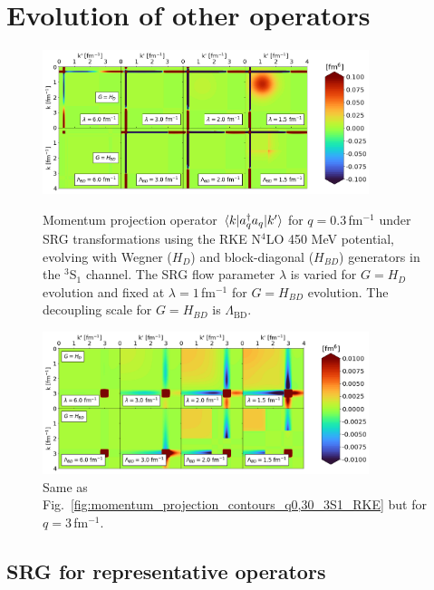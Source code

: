 \documentclass[10pt,aps,prc,floatfix,twocolumn,nofootinbib]{revtex4-1}
\newcommand{\LambdaBD}{{\Lambda_{\text{BD}}}}
\newcommand{\ataq}{a^{\dagger}_q a_q}
\begin{document}
\section{Evolution of other operators}
\label{sec:evolution_other_operators}

%
\begin{figure}[t!]
	\includegraphics[clip,width=0.85\textwidth]{momentum_projection_contours_q0p30_kvnn_111_3S1.png}%
	\caption{Momentum projection operator $\mel{k}{\ataq}{k'}$ for $q=0.3$\,fm$^{-1}$ under SRG transformations using the RKE N$^4$LO 450 MeV potential, evolving with Wegner ($H_D$) and block-diagonal ($H_{BD}$) generators in the $^3$S$_1$ channel. The SRG flow parameter $\lambda$ is varied for $G = H_D$ evolution and fixed at $\lambda=1$\,fm$^{-1}$ for $G = H_{BD}$ evolution. The decoupling scale for $G = H_{BD}$ is $\LambdaBD$.}
	\label{fig:momentum_projection_contours_q0,30_3S1_RKE}

\medskip\smallskip

	\includegraphics[clip,width=0.85\textwidth]{momentum_projection_contours_q3p00_kvnn_111_3S1.png}%
	\caption{Same as Fig.~\ref{fig:momentum_projection_contours_q0,30_3S1_RKE} but for $q=3$\,fm$^{-1}$.}
	\label{fig:momentum_projection_contours_q3,00_3S1_RKE}
\end{figure}
%

\subsection{SRG for representative operators}
\label{subsec:representative_ops}
\end{document}
